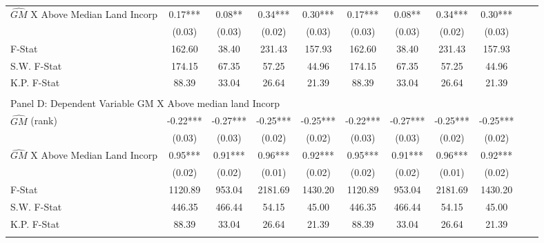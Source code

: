 \begin{table}[htbp]
\begin{threeparttable}
\begin{tabular}{l*{10}{c}}
\addlinespace
$\hat{GM}$ X Above Median Land Incorp&       0.17***&       0.08** &       0.34***&       0.30***&       0.17***&       0.08** &       0.34***&       0.30***\\
                &     (0.03)   &     (0.03)   &     (0.02)   &     (0.03)   &     (0.03)   &     (0.03)   &     (0.02)   &     (0.03)   \\
\midrule
F-Stat          &     162.60   &      38.40   &     231.43   &     157.93   &     162.60   &      38.40   &     231.43   &     157.93   \\
S.W. F-Stat     &     174.15   &      67.35   &      57.25   &      44.96   &     174.15   &      67.35   &      57.25   &      44.96   \\
K.P. F-Stat     &      88.39   &      33.04   &      26.64   &      21.39   &      88.39   &      33.04   &      26.64   &      21.39   \\
\cmidrule[\heavyrulewidth](lr){1-9} \\ \cmidrule[\heavyrulewidth](lr){1-9}
\multicolumn{8}{l}{Panel D: Dependent Variable GM X Above median land Incorp}\\
\cmidrule(lr){1-9}
$\hat{GM}$ (rank)&      -0.22***&      -0.27***&      -0.25***&      -0.25***&      -0.22***&      -0.27***&      -0.25***&      -0.25***\\
                &     (0.03)   &     (0.03)   &     (0.02)   &     (0.02)   &     (0.03)   &     (0.03)   &     (0.02)   &     (0.02)   \\
\addlinespace
$\hat{GM}$ X Above Median Land Incorp&       0.95***&       0.91***&       0.96***&       0.92***&       0.95***&       0.91***&       0.96***&       0.92***\\
                &     (0.02)   &     (0.02)   &     (0.01)   &     (0.02)   &     (0.02)   &     (0.02)   &     (0.01)   &     (0.02)   \\
\midrule
F-Stat          &    1120.89   &     953.04   &    2181.69   &    1430.20   &    1120.89   &     953.04   &    2181.69   &    1430.20   \\
S.W. F-Stat     &     446.35   &     466.44   &      54.15   &      45.00   &     446.35   &     466.44   &      54.15   &      45.00   \\
K.P. F-Stat     &      88.39   &      33.04   &      26.64   &      21.39   &      88.39   &      33.04   &      26.64   &      21.39   \\
\cmidrule[\heavyrulewidth](lr){1-9} \\ \cmidrule[\heavyrulewidth](lr){1-9}

\end{tabular}
\end{threeparttable}
\end{table}
